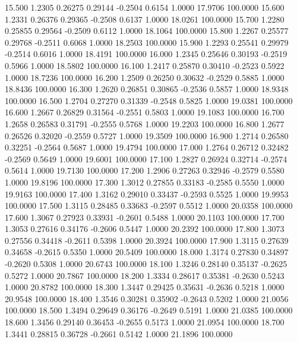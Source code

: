   15.500   1.2305   0.26275   0.29144  -0.2504   0.6154   1.0000  17.9706 100.0000
  15.600   1.2331   0.26376   0.29365  -0.2508   0.6137   1.0000  18.0261 100.0000
  15.700   1.2280   0.25855   0.29564  -0.2509   0.6112   1.0000  18.1064 100.0000
  15.800   1.2267   0.25577   0.29768  -0.2511   0.6068   1.0000  18.2503 100.0000
  15.900   1.2293   0.25541   0.29979  -0.2514   0.6016   1.0000  18.4191 100.0000
  16.000   1.2345   0.25646   0.30193  -0.2519   0.5966   1.0000  18.5802 100.0000
  16.100   1.2417   0.25870   0.30410  -0.2523   0.5922   1.0000  18.7236 100.0000
  16.200   1.2509   0.26250   0.30632  -0.2529   0.5885   1.0000  18.8436 100.0000
  16.300   1.2620   0.26851   0.30865  -0.2536   0.5857   1.0000  18.9348 100.0000
  16.500   1.2704   0.27270   0.31339  -0.2548   0.5825   1.0000  19.0381 100.0000
  16.600   1.2667   0.26829   0.31564  -0.2551   0.5803   1.0000  19.1083 100.0000
  16.700   1.2658   0.26583   0.31791  -0.2555   0.5768   1.0000  19.2203 100.0000
  16.800   1.2677   0.26526   0.32020  -0.2559   0.5727   1.0000  19.3509 100.0000
  16.900   1.2714   0.26580   0.32251  -0.2564   0.5687   1.0000  19.4794 100.0000
  17.000   1.2764   0.26712   0.32482  -0.2569   0.5649   1.0000  19.6001 100.0000
  17.100   1.2827   0.26924   0.32714  -0.2574   0.5614   1.0000  19.7130 100.0000
  17.200   1.2906   0.27263   0.32946  -0.2579   0.5580   1.0000  19.8196 100.0000
  17.300   1.3012   0.27855   0.33183  -0.2585   0.5550   1.0000  19.9163 100.0000
  17.400   1.3162   0.29010   0.33437  -0.2593   0.5525   1.0000  19.9953 100.0000
  17.500   1.3115   0.28485   0.33683  -0.2597   0.5512   1.0000  20.0358 100.0000
  17.600   1.3067   0.27923   0.33931  -0.2601   0.5488   1.0000  20.1103 100.0000
  17.700   1.3053   0.27616   0.34176  -0.2606   0.5447   1.0000  20.2392 100.0000
  17.800   1.3073   0.27556   0.34418  -0.2611   0.5398   1.0000  20.3924 100.0000
  17.900   1.3115   0.27639   0.34658  -0.2615   0.5350   1.0000  20.5409 100.0000
  18.000   1.3174   0.27830   0.34897  -0.2620   0.5308   1.0000  20.6743 100.0000
  18.100   1.3246   0.28140   0.35137  -0.2625   0.5272   1.0000  20.7867 100.0000
  18.200   1.3334   0.28617   0.35381  -0.2630   0.5243   1.0000  20.8782 100.0000
  18.300   1.3447   0.29425   0.35631  -0.2636   0.5218   1.0000  20.9548 100.0000
  18.400   1.3546   0.30281   0.35902  -0.2643   0.5202   1.0000  21.0056 100.0000
  18.500   1.3494   0.29649   0.36176  -0.2649   0.5191   1.0000  21.0385 100.0000
  18.600   1.3456   0.29140   0.36453  -0.2655   0.5173   1.0000  21.0954 100.0000
  18.700   1.3441   0.28815   0.36728  -0.2661   0.5142   1.0000  21.1896 100.0000
